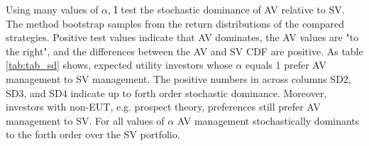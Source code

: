 %	
Using many values of $\alpha$, I test the stochastic dominance of AV relative to SV. %
The \citet{vinod_h.d._ranking_2004,vinod_hands-intermediate_2008} method bootstrap samples from the return distributions of the compared strategies. Positive test values indicate that AV dominates, the AV values are "to the right", and the differences between the AV and SV CDF are positive. As table \ref{tab:tab_sd} shows, expected utility investors whose $\alpha$ equals 1 prefer AV management to SV management. The positive numbers in across columns SD2, SD3, and SD4 indicate up to forth order stochastic dominance. Moreover, investors with non-EUT, e.g. prospect theory, preferences still prefer AV management to SV. \citep{kahneman_prospect_1979} For all values of $\alpha$ AV management stochastically dominants to the forth order over the SV portfolio.
%

